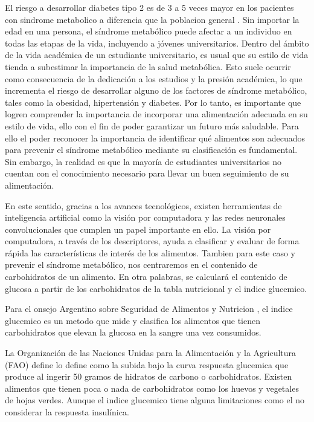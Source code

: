 El riesgo a desarrollar diabetes tipo 2 es de 3 a 5 veces mayor en los pacientes con sindrome metabolico a diferencia que la poblacion general \parencite{dobrowolski2022metabolic}. Sin importar la edad en una persona, el síndrome metabólico puede afectar a un individuo en todas las etapas de la vida, incluyendo a jóvenes universitarios. Dentro del ámbito de la vida académica de un estudiante universitario, es usual que su estilo de vida tienda a subestimar la importancia de la salud metabólica. Esto suele ocurrir como consecuencia de la dedicación a los estudios y la presión académica, lo que incrementa el riesgo de desarrollar alguno de los factores de síndrome metabólico, tales como la obesidad, hipertensión y diabetes. Por lo tanto, es importante que logren comprender la importancia de incorporar una alimentación adecuada en su estilo de vida, ello con el fin de poder garantizar un futuro más saludable. Para ello el poder reconocer la importancia de identificar qué alimentos son adecuados para prevenir el síndrome metabólico mediante su clasificación es fundamental. Sin embargo, la realidad es que la mayoría de estudiantes universitarios no cuentan con el conocimiento necesario para llevar un buen seguimiento de su alimentación. 

En este sentido, gracias a los avances tecnológicos, existen herramientas de inteligencia artificial como la visión por computadora y las redes neuronales convolucionales que cumplen un papel importante en ello. La visión por computadora, a través de los descriptores, ayuda a clasificar y evaluar de forma rápida las características de interés de los alimentos. Tambien para este caso y prevenir el síndrome metabólico, nos centraremos en el contenido de carbohidratos de un alimento. En otra palabras, se calculará el contenido de glucosa a partir de los carbohidratos de la tabla nutricional y el indice glucemico.

Para el onsejo Argentino sobre Seguridad de Alimentos y Nutricion \parencite{CISAN} , el indice glucemico es un metodo que mide y clasifica los alimentos que tienen carbohidratos que elevan la glucosa en la sangre una vez consumidos. 

La Organización de las Naciones Unidas para la Alimentación y la Agricultura (FAO) define lo define como  la subida bajo la curva respuesta glucemica que produce al ingerir 50 gramos de hidratos de carbono  o carbohidratos. Existen alimentos que tienen poca o nada de carbohidratos como los huevos y vegetales de hojas verdes. Aunque el indice glucemico tiene alguna limitaciones como el no considerar la respuesta insulínica.

